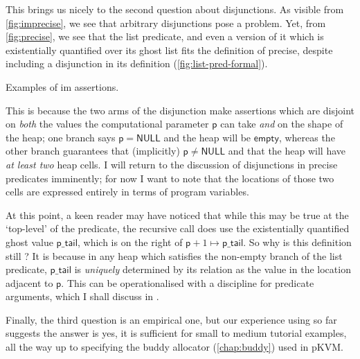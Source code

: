This brings us nicely to the second question about disjunctions. As visible
from \cref{fig:imprecise}, we see that arbitrary disjunctions pose a problem.
Yet, from \cref{fig:precise}, we see that the list predicate, and even a
version of it which is existentially quantified over its ghost list fits the
definition of precise, despite including a disjunction in its definition
(\cref{fig:list-pred-formal}).

\begin{marginfigure}
\small%
\caption{Examples of im assertions.}\label{fig:imprecise}
\end{marginfigure}

This is because the two arms of the disjunction make assertions
which are disjoint on \emph{both} the values the computational parameter
$\mathsf{p}$ can take \emph{and} on the shape of the heap; one branch says
$\mathsf{p} = \mathsf{NULL}$ and the heap will be $\mathsf{empty}$, whereas the
other branch guarantees that (implicitly) $\mathsf{p} \neq \mathsf{NULL}$ and
that the heap will have \emph{at least two} heap cells. I will return to the
discussion of disjunctions in precise predicates imminently; for now I want to
note that the locations of those two cells are expressed entirely in terms of
program variables.

At this point, a keen reader may have noticed that while this may be true at
the `top-level' of the predicate, the recursive call does use the existentially
quantified ghost value $\mathsf{p\_tail}$, which is on the right of $\mathsf{p}
+ 1 \mapsto{} \mathsf{p\_tail}$. So why is this definition still ?
It is because in any heap which satisfies the non-empty branch of the list
predicate, $\mathsf{p\_tail}$ is \emph{uniquely} determined by its relation as
the value in the location adjacent to $\mathsf{p}$. This can be operationalised with a 
discipline for predicate arguments, which I shall discuss in
.

Finally, the third question is an empirical one, but our experience using
 so far~ suggests the answer is
yes, it is sufficient for small to medium tutorial examples, all the way up to
specifying the buddy allocator (\cref{chap:buddy}) used in pKVM\@.

